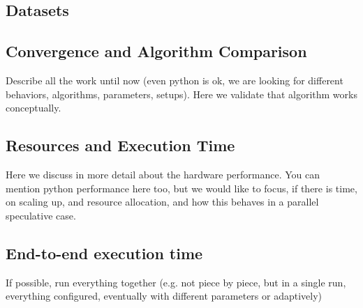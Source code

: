 \subsection{Datasets}

\subsection{Convergence and Algorithm Comparison}

Describe all the work until now (even python is ok, we are looking for different behaviors, algorithms, parameters, setups). Here we validate that algorithm works conceptually.

\subsection{Resources and Execution Time}

Here we discuss in more detail about the hardware performance. You can mention python performance here too, but we would like to focus, if there is time, on scaling up, and resource allocation, and how this behaves in a parallel speculative case.

\subsection{End-to-end execution time}

If possible, run everything together (e.g. not piece by piece, but in a single run, everything configured, eventually with different parameters or adaptively)